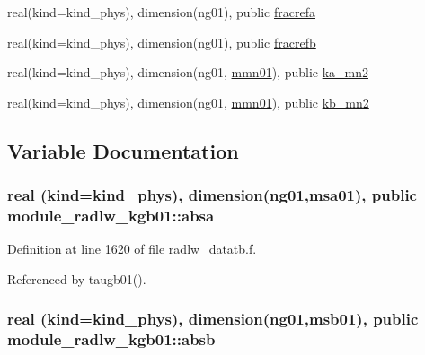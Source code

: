 \begin{DoxyCompactItemize}
real(kind=kind\+\_\+phys), dimension(ng01), public \hyperlink{namespacemodule__radlw__kgb01_a0bca660247ac37483cd55c6936056631}{fracrefa}
\item 
real(kind=kind\+\_\+phys), dimension(ng01), public \hyperlink{namespacemodule__radlw__kgb01_a19b6a3893965817e82c77bee1de536cd}{fracrefb}
\item 
real(kind=kind\+\_\+phys), dimension(ng01, \hyperlink{namespacemodule__radlw__kgb01_a218c6844f9043f362571f091a4f80522}{mmn01}), public \hyperlink{namespacemodule__radlw__kgb01_a0a4f08c625f2f25f132200811af42331}{ka\+\_\+mn2}
\item 
real(kind=kind\+\_\+phys), dimension(ng01, \hyperlink{namespacemodule__radlw__kgb01_a218c6844f9043f362571f091a4f80522}{mmn01}), public \hyperlink{namespacemodule__radlw__kgb01_ac357df5f66a7e384e22db58203ac294a}{kb\+\_\+mn2}
\end{DoxyCompactItemize}


\subsection{Variable Documentation}
\subsubsection[{\texorpdfstring{absa}{absa}}]{\setlength{\rightskip}{0pt plus 5cm}real (kind=kind\+\_\+phys), dimension(ng01,{\bf msa01}), public module\+\_\+radlw\+\_\+kgb01\+::absa}\hypertarget{namespacemodule__radlw__kgb01_acdbe767d50d503c4a89d4042dd0dee8e}{}\label{namespacemodule__radlw__kgb01_acdbe767d50d503c4a89d4042dd0dee8e}


Definition at line 1620 of file radlw\+\_\+datatb.\+f.



Referenced by taugb01().

\subsubsection[{\texorpdfstring{absb}{absb}}]{\setlength{\rightskip}{0pt plus 5cm}real (kind=kind\+\_\+phys), dimension(ng01,{\bf msb01}), public module\+\_\+radlw\+\_\+kgb01\+::absb}\hypertarget{namespacemodule__radlw__kgb01_abdaefe1c38d8bfcac5ef9b878fac77cb}{}\label{namespacemodule__radlw__kgb01_abdaefe1c38d8bfcac5ef9b878fac77cb}


